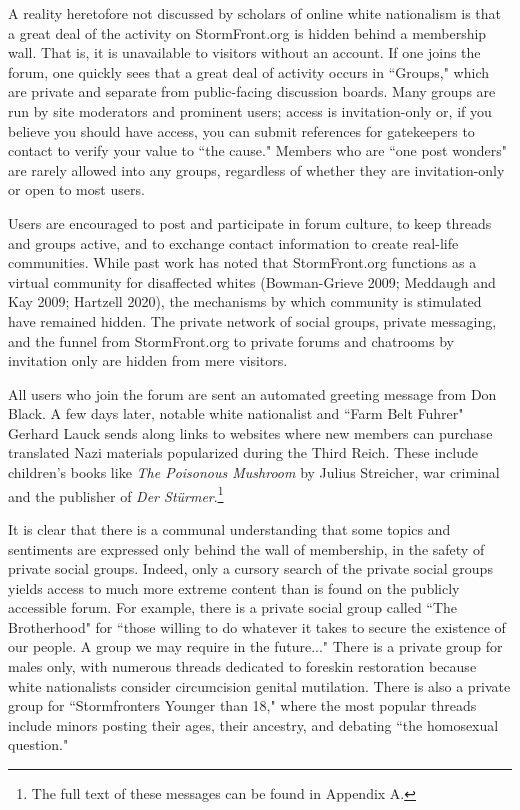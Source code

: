\documentclass[12pt]{paper}
\begin{document}
A reality heretofore not discussed by scholars of online white nationalism is that a great deal of the activity on StormFront.org is hidden behind a membership wall. That is, it is unavailable to visitors without an account. If one joins the forum, one quickly sees that a great deal of activity occurs in ``Groups," which are private and separate from public-facing discussion boards. Many groups are run by site moderators and prominent users; access is invitation-only or, if you believe you should have access, you can submit references for gatekeepers to contact to verify your value to ``the cause." Members who are ``one post wonders" are rarely allowed into any groups, regardless of whether they are invitation-only or open to most users.

Users are encouraged to post and participate in forum culture, to keep threads and groups active, and to exchange contact information to create real-life communities. While past work has noted that StormFront.org functions as a virtual community for disaffected whites (Bowman-Grieve 2009; Meddaugh and Kay 2009; Hartzell 2020), the mechanisms by which community is stimulated have remained hidden. The private network of social groups, private messaging, and the funnel from StormFront.org to private forums and chatrooms by invitation only are hidden from mere visitors.

All users who join the forum are sent an automated greeting message from Don Black. A few days later, notable white nationalist and ``Farm Belt Fuhrer" Gerhard Lauck sends along links to websites where new members can purchase translated Nazi materials popularized during the Third Reich. These include children's books like \textit{The Poisonous Mushroom} by Julius Streicher, war criminal and the publisher of \textit{Der Stürmer}.\footnote{The full text of these messages can be found in Appendix A.} 

It is clear that there is a communal understanding that some topics and sentiments are expressed only behind the wall of membership, in the safety of private social groups. Indeed, only a cursory search of the private social groups yields access to much more extreme content than is found on the publicly accessible forum. For example, there is a private social group called ``The Brotherhood" for ``those willing to do whatever it takes to secure the existence of our people. A group we may require in the future..." There is a private group for males only, with numerous threads dedicated to foreskin restoration because white nationalists consider circumcision genital mutilation. There is also a private group for ``Stormfronters Younger than 18," where the most popular threads include minors posting their ages, their ancestry, and debating ``the homosexual question."
\end{document}
